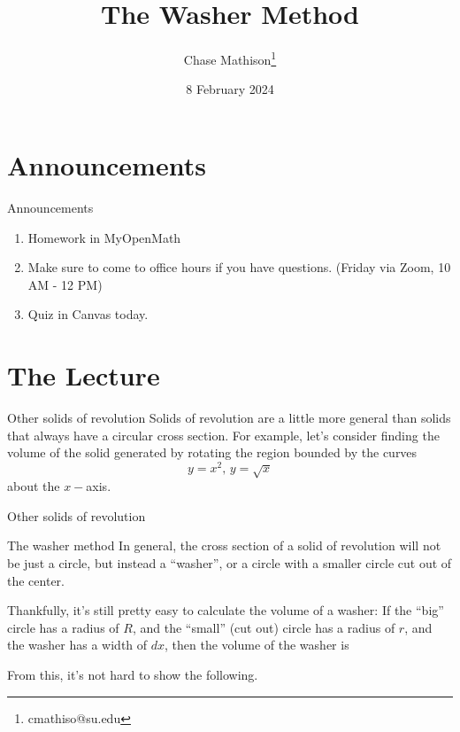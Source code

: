 \documentclass[presentation]{beamer}
\institute[SU]{Shenandoah University}
\author{Chase Mathison\thanks{cmathiso@su.edu}}
\date{8 February 2024}
\title{The Washer Method}
\begin{document}
\maketitle

\section{Announcements}
\label{sec:org6adc040}
\begin{frame}[label={sec:org0d4f3c9}]{Announcements}
\begin{enumerate}
\item Homework in MyOpenMath
\item Make sure to come to office hours if you have questions. (Friday
via Zoom, 10 AM - 12 PM)
\item Quiz in Canvas today.
\end{enumerate}
\end{frame}

\section{The Lecture}
\label{sec:org24a316c}
\begin{frame}[label={sec:org2f91d53}]{Other solids of revolution}
Solids of revolution are a little more general than solids that always
have a circular cross section.  
For example, let's consider finding the volume of the solid generated by
rotating the region bounded by the curves
\[
y = x^2,\, y = \sqrt{x}\]
about the \(x-\)axis.
\vspace{10in}
\end{frame}

\begin{frame}[label={sec:org045b8e9}]{Other solids of revolution}
\end{frame}

\begin{frame}[label={sec:org5fa38b1}]{The washer method}
In general, the cross section of a solid of revolution will \alert{not} be
just a circle, but instead a ``washer'', or a circle with a smaller
circle cut out of the center.

Thankfully, it's still pretty easy to calculate the volume of a washer:
If the ``big'' circle has a radius of \(R\), and the ``small'' (cut out)
circle has a radius of \(r\), and the washer has a width of \(dx\),
then the volume of the washer is 
\[
 \]

From this, it's not hard to show the following.
\end{frame}
\end{document}
